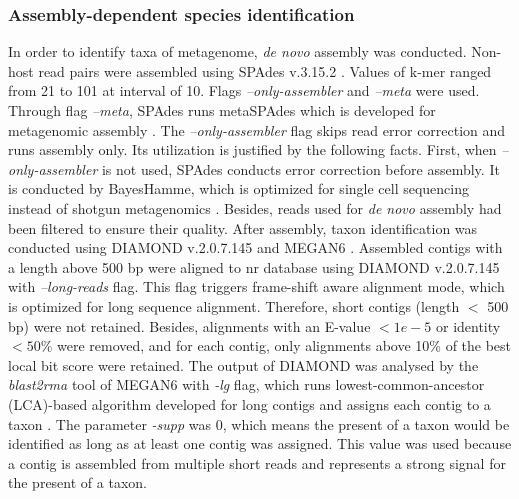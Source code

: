 \documentclass[11pt]{article}
\begin{document}
    \subsubsection{Assembly-dependent species identification}
    \label{AssemblyDependent}
    In order to identify taxa of metagenome, \textit{de novo} assembly was conducted. 
    Non-host read pairs were assembled using SPAdes v.3.15.2 \citep{prjibelski2020using}. 
    Values of k-mer ranged from 21 to 101 at interval of 10. 
    Flags \textit{--only-assembler} and \textit{--meta} were used. 
    Through flag \textit{--meta}, SPAdes runs metaSPAdes which is developed for metagenomic assembly \citep{nurk2017metaspades}. 
    The \textit{--only-assembler} flag skips read error correction and runs assembly only. 
    Its utilization is justified by the following facts. 
    First, when \textit{--only-assembler} is not used, SPAdes conducts error correction before assembly. 
    It is conducted by BayesHamme, which is optimized for single cell sequencing instead of shotgun metagenomics \citep{nikolenko2013bayeshammer}. 
    Besides, reads used for \textit{de novo} assembly had been filtered to ensure their quality.
    \newline
    After assembly, taxon identification was conducted using DIAMOND v.2.0.7.145 \citep{buchfink2015fast} and MEGAN6 \citep{huson2007megan}. 
    Assembled contigs with a length above 500 bp were aligned to nr database using DIAMOND v.2.0.7.145 with \textit{--long-reads} flag. 
    This flag triggers frame-shift aware alignment mode, which is optimized for long sequence alignment. 
    Therefore, short contigs (length $<$ 500 bp) were not retained. 
    Besides, alignments with an E-value $< 1e-5$ or identity $< 50\%$ were removed, and for each contig, only alignments above 10\% of the best local bit score were retained. 
    The output of DIAMOND was analysed by the \textit{blast2rma} tool of MEGAN6 with \textit{-lg} flag, which runs lowest-common-ancestor (LCA)-based algorithm developed for long contigs and assigns each contig to a taxon \citep{huson2018megan}. 
    The parameter \textit{-supp} was 0, which means the present of a taxon would be identified as long as at least one contig was assigned. 
    This value was used because a contig is assembled from multiple short reads and represents a strong signal for the present of a taxon.
    
\end{document}
